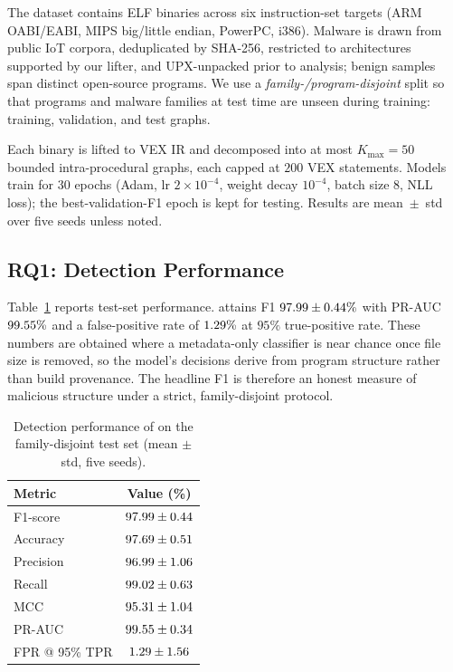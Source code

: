 \documentclass[conference]{IEEEtran}
\begin{document}
The dataset contains \dsTotal{} ELF binaries across six instruction-set
targets (ARM OABI/EABI, MIPS big/little endian, PowerPC, i386). Malware is
drawn from public IoT corpora, deduplicated by SHA-256, restricted to
architectures supported by our lifter, and UPX-unpacked prior to analysis;
benign samples span \dsBenignProg{} distinct open-source programs. We use a
\emph{family-/program-disjoint} split so that programs and malware
families at test time are unseen during training: \dsTrain{} training,
\dsVal{} validation, and \dsTest{} test graphs.

Each binary is lifted to VEX IR and decomposed into at most $K_{\max}=50$
bounded intra-procedural graphs, each capped at $200$ VEX statements.
Models train for $30$ epochs (Adam, lr $2\times10^{-4}$, weight decay
$10^{-4}$, batch size $8$, NLL loss); the best-validation-F1 epoch is kept
for testing. Results are mean~$\pm$~std over five seeds unless noted.

\subsection{RQ1: Detection Performance}
\label{sec:detection}

Table~\ref{tab:detection} reports test-set performance. 
attains F1 $97.99{}\pm0.44{}\%$ with PR-AUC $99.55{}\%$ and a
false-positive rate of $1.29{}\%$ at $95\%$ true-positive rate. These
numbers are obtained where a metadata-only classifier is near chance once
file size is removed, so the model's decisions derive from program
structure rather than build provenance. The headline F1 is therefore an
honest measure of malicious structure under a strict, family-disjoint
protocol.

\begin{table}[t]
\centering
\caption{Detection performance of  on the family-disjoint test
set (mean $\pm$ std, five seeds).}
\label{tab:detection}
\begin{tabular}{lc}
\hline
Metric & Value (\%) \\
\hline
F1-score        & $97.99 \pm 0.44$ \\
Accuracy        & $97.69 \pm 0.51$ \\
Precision       & $96.99 \pm 1.06$ \\
Recall          & $99.02 \pm 0.63$ \\
MCC             & $95.31 \pm 1.04$ \\
PR-AUC          & $99.55 \pm 0.34$ \\
FPR @ 95\% TPR  & $1.29 \pm 1.56$ \\
\hline
\end{tabular}
\end{table}
\end{document}
